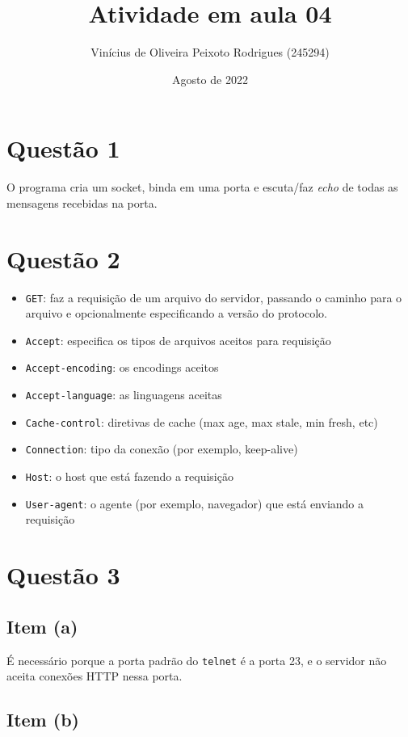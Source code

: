 \documentclass{article}
\title{Atividade em aula 04}
\author{Vinícius de Oliveira Peixoto Rodrigues (245294)}
\date{Agosto de 2022}
\begin{document}
\maketitle

\section*{Questão 1}
O programa cria um socket, binda em uma porta e escuta/faz \textit{echo} de todas as mensagens recebidas na porta.

\section*{Questão 2}
\begin{itemize}
    \item \texttt{GET}: faz a requisição de um arquivo do servidor, passando o caminho para o arquivo e opcionalmente especificando a versão do protocolo.
    \item \texttt{Accept}: especifica os tipos de arquivos aceitos para requisição
    \item \texttt{Accept-encoding}: os encodings aceitos
    \item \texttt{Accept-language}: as linguagens aceitas
    \item \texttt{Cache-control}: diretivas de cache (max age, max stale, min fresh, etc)
    \item \texttt{Connection}: tipo da conexão (por exemplo, keep-alive)
    \item \texttt{Host}: o host que está fazendo a requisição
    \item \texttt{User-agent}: o agente (por exemplo, navegador) que está enviando a requisição
\end{itemize}

\section*{Questão 3}

\subsection*{Item (a)}

É necessário porque a porta padrão do \texttt{telnet} é a porta 23, e o servidor não aceita conexões HTTP nessa porta.

\subsection*{Item (b)}
\end{document}
